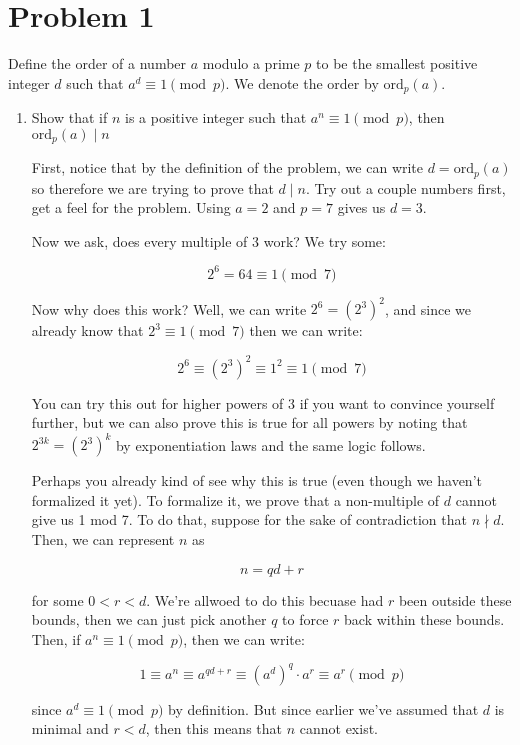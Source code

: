\documentclass[10pt]{article}
\newcommand{\ord}{\mathrm{ord}}
\begin{document}
\section*{Problem 1}

Define the order of a number $a$ modulo a prime $p$ to be the smallest positive integer $d$ such that $a^d \equiv 1 \pmod{p}$. We denote the order by $\ord_p(a)$. 

\begin{enumerate}[1.]
    \item Show that if $n$ is a positive integer such that $a^n \equiv 1 \pmod p$, then $\ord_p(a) \mid n$
    
    \begin{solution}
        First, notice that by the definition of the problem, we can write $d = \ord_p(a)$ so therefore we are trying to prove that $d \mid  n$. Try out a couple numbers first, get a feel for the problem. Using $a = 2$ and $p = 7$ gives us $d = 3$. 

        Now we ask, does every multiple of 3 work? We try some: 

        \[ 2^6 = 64 \equiv 1 \pmod 7\] 

        Now why does this work? Well, we can write $2^6 = (2^3)^2$, and since we already know that $2^3 \equiv 1 \pmod 7$ then we can write:

        \[ 2^6 \equiv (2^3)^2 \equiv 1^2 \equiv 1 \pmod 7\]

        You can try this out for higher powers of 3 if you want to convince yourself further, but we can also prove this is true for all powers by noting that $2^{3k} = (2^3)^k$ by exponentiation laws and the same logic follows. 

        Perhaps you already kind of see why this is true (even though we haven't formalized it yet). To formalize it, we prove that a non-multiple of $d$ cannot give us 1 mod 7. To do that, suppose for the sake of contradiction that $n \nmid d$. Then, we can represent $n$ as 

        \[ n = qd + r\] 

        for some $0 < r < d$. We're allwoed to do this becuase had $r$ been outside these bounds, then we can just pick another $q$ to force $r$ back within these bounds. Then, if $a^n \equiv 1 \pmod p$, then we can write:

        \[ 1 \equiv a^n \equiv a^{qd + r} \equiv (a^d)^q \cdot a^r \equiv a^r \pmod p\]

        since $a^d \equiv 1 \pmod p$ by definition. But since earlier we've assumed that $d$ is minimal and $r < d$, then this means that $n$ cannot exist.


\end{solution}
\end{enumerate}
\end{document}
